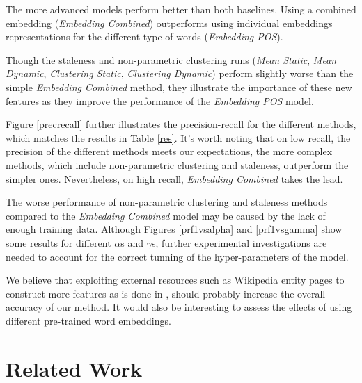 \documentclass{article}
\begin{document}
The more advanced models perform better than both baselines. Using a combined embedding ({\textit{Embedding Combined}}) outperforms using individual embeddings representations for the different type of words ({\textit{Embedding POS}}).

Though the staleness and non-parametric clustering runs ({\textit{Mean Static}}, {\textit{Mean Dynamic}}, {\textit{Clustering Static}}, {\textit{Clustering Dynamic}}) perform slightly worse than the simple {\textit{Embedding Combined}} method, they illustrate the importance of these new features as they improve the performance of the {\textit{Embedding POS}} model.

Figure \ref{precrecall} further illustrates the precision-recall for the different methods, which matches the results in Table \ref{res}. It's worth noting that on low recall, the precision of the different methods meets our expectations, the more complex methods, which include non-parametric clustering and staleness, outperform the simpler ones. Nevertheless, on high recall, {\textit{Embedding Combined}} takes the lead.




The worse performance of non-parametric clustering and staleness methods compared to the {\textit{Embedding Combined}} model may be caused by the lack of enough training data. Although Figures \ref{prf1vsalpha} and \ref{prf1vsgamma} show some results for different $\alpha$s and $\gamma$s, further experimental investigations are needed to account for the correct tunning of the hyper-parameters of the model.

We believe that exploiting external resources such as Wikipedia entity pages to construct more features as is done in \citet{xitong12}, should probably increase the overall accuracy of our method. It would also be interesting to assess the effects of using different pre-trained word embeddings.

\section{Related Work}
\label{related}
\end{document}
